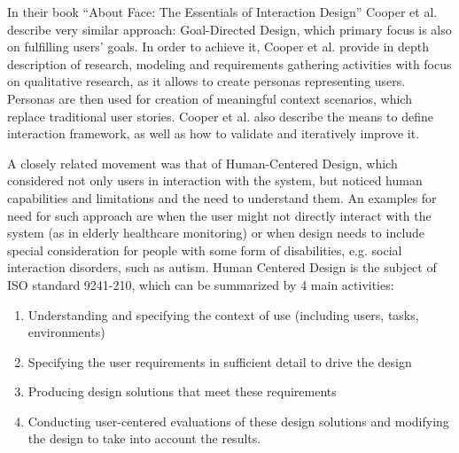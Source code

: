 \documentclass{article}
\begin{document}
In their book ``About Face: The Essentials of Interaction Design'' Cooper et al. \cite{cooper2014face} describe very similar approach: Goal-Directed Design, which primary focus is also on fulfilling users' goals. In order to achieve it, Cooper et al. provide in depth description of research, modeling and requirements gathering activities with focus on qualitative research, as it allows to create personas representing users. Personas are then used for creation of meaningful context scenarios, which replace traditional user stories. Cooper et al. also describe the means to define interaction framework, as well as how to validate and iteratively improve it.

A closely related movement was that of Human-Centered Design, which considered not only users in interaction with the system, but noticed human capabilities and limitations and the need to understand them. An examples for need for such approach are when the user might not directly interact with the system (as in elderly healthcare monitoring) or when design needs to include special consideration for people with some form of disabilities, e.g. social interaction disorders, such as autism. Human Centered Design is the subject of ISO standard 9241-210, which can be summarized by 4 main activities:
\begin{enumerate}
  \item Understanding and specifying the context of use (including users, tasks, environments)
  \item Specifying the user requirements in sufficient detail to drive the design
  \item Producing design solutions that meet these requirements
  \item Conducting user-centered evaluations of these design solutions and modifying the design to take into account the results.
\end{enumerate}
\end{document}

